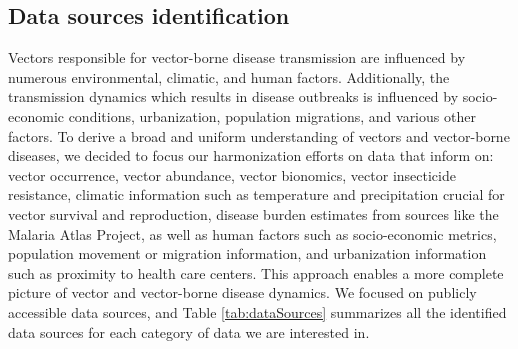 \documentclass{article}
\begin{document}
\subsection{Data sources identification}
\par
Vectors responsible for vector-borne disease transmission are influenced by numerous environmental, climatic, and human factors. 
Additionally, the transmission dynamics which results in disease outbreaks is influenced by socio-economic conditions, urbanization, 
population migrations, and various other factors. To derive a broad and uniform understanding of vectors and vector-borne diseases, 
we decided to focus our harmonization efforts on data that inform on: vector occurrence, vector abundance, vector bionomics, 
vector insecticide resistance, climatic information such as temperature and precipitation crucial for vector survival and reproduction, 
disease burden estimates from sources like the Malaria Atlas Project, as well as human factors such as socio-economic metrics, 
population movement or migration information, and urbanization information such as proximity to health care centers. This approach 
enables a more complete picture of vector and vector-borne disease dynamics. We focused on publicly accessible data sources, and 
Table \ref{tab:dataSources} summarizes all the identified data sources for each category of data we are interested in.

\begingroup
\small
\renewcommand{\arraystretch}{1.2}
\end{document}
